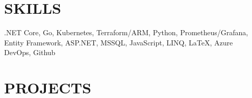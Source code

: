 \documentclass[margin, 10pt, hidelinks]{res} %
\newcommand{\emphasize}{\bf} %
\begin{document}
\begin{resume}


\section{SKILLS}

.NET Core, Go, Kubernetes, Terraform/ARM, Python, Prometheus/Grafana, Entity Framework, ASP.NET, MSSQL, JavaScript, LINQ, LaTeX,
Azure DevOps, Github

\section{PROJECTS}


\end{resume}
\end{document}
